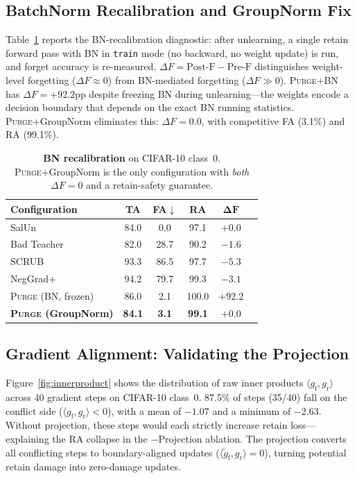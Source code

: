 \documentclass[letterpaper]{article} %
\newcommand{\ours}{\textsc{Purge}}
\newcommand{\gf}{g_{\mathrm{f}}}
\newcommand{\gr}{g_{\mathrm{r}}}
\newcommand{\gproj}{\tilde{g}_{\mathrm{f}}}
\begin{document}
\subsection{BatchNorm Recalibration and GroupNorm Fix}

Table~\ref{tab:comparison} reports the BN-recalibration diagnostic: after unlearning, a single retain forward pass with BN in \texttt{train} mode (no backward, no weight update) is run, and forget accuracy is re-measured.
$\Delta F = \mathrm{Post\text{-}F} - \mathrm{Pre\text{-}F}$ distinguishes weight-level forgetting ($\Delta F \approx 0$) from BN-mediated forgetting ($\Delta F \gg 0$).
\ours{}+BN has $\Delta F = +92.2$pp despite freezing BN during unlearning---the weights encode a decision boundary that depends on the exact BN running statistics.
\ours{}+GroupNorm eliminates this: $\Delta F = 0.0$, with competitive FA (3.1\%) and RA (99.1\%).

\begin{table}[t]
\centering
\small
\setlength{\tabcolsep}{3pt}
\caption{\textbf{BN recalibration} on CIFAR-10 class~0. \ours{}+GroupNorm is the only configuration with \emph{both} $\Delta F = 0$ and a retain-safety guarantee.}
\label{tab:comparison}
\begin{tabular}{@{}lccccc@{}}
\toprule
\textbf{Configuration} & \textbf{TA} & \textbf{FA}$\downarrow$ & \textbf{RA} & $\boldsymbol{\Delta F}$ \\
\midrule
SalUn & 84.0 & 0.0 & 97.1 & $+0.0$ \\
Bad Teacher & 82.0 & 28.7 & 90.2 & $-1.6$ \\
SCRUB & 93.3 & 86.5 & 97.7 & $-5.3$ \\
NegGrad+ & 94.2 & 79.7 & 99.3 & $-3.1$ \\
\midrule
\ours{} (BN, frozen) & 86.0 & 2.1 & 100.0 & $+92.2$ \\
\textbf{\ours{} (GroupNorm)} & \textbf{84.1} & \textbf{3.1} & \textbf{99.1} & $\boldsymbol{+0.0}$ \\
\bottomrule
\end{tabular}
\end{table}

\subsection{Gradient Alignment: Validating the Projection}

Figure~\ref{fig:innerproduct} shows the distribution of raw inner products $\langle \gf, \gr \rangle$ across 40 gradient steps on CIFAR-10 class~0.
87.5\% of steps (35/40) fall on the conflict side ($\langle \gf, \gr \rangle < 0$), with a mean of $-1.07$ and a minimum of $-2.63$.
Without projection, these steps would each strictly increase retain loss---explaining the RA collapse in the $-$Projection ablation.
The projection converts all conflicting steps to boundary-aligned updates ($\langle \gproj, \gr \rangle = 0$), turning potential retain damage into zero-damage updates.
\end{document}
